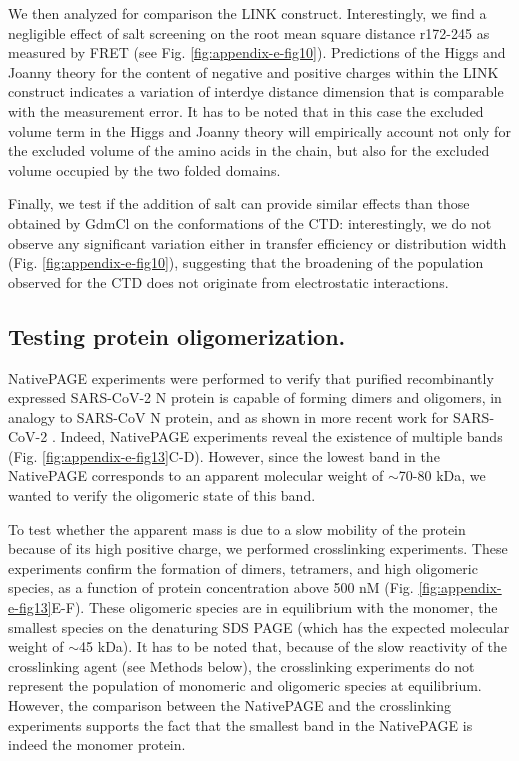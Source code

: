 \documentclass[../main.tex]{subfiles}
\begin{document}
        We then analyzed for comparison the LINK construct. Interestingly, we find a negligible effect of salt screening on the root mean square distance r172-245 as measured by FRET (see Fig. \ref{fig:appendix-e-fig10}). Predictions of the Higgs and Joanny theory for the content of negative and positive charges within the LINK construct indicates a variation of interdye distance dimension that is comparable with the measurement error. It has to be noted that in this case the excluded volume term in the Higgs and Joanny theory will empirically account not only for the excluded volume of the amino acids in the chain, but also for the excluded volume occupied by the two folded domains. 

        Finally, we test if the addition of salt can provide similar effects than those obtained by GdmCl on the conformations of the CTD: interestingly, we do not observe any significant variation either in transfer efficiency or distribution width (Fig. \ref{fig:appendix-e-fig10}), suggesting that the broadening of the population observed for the CTD does not originate from electrostatic interactions. 

    \subsection{Testing protein oligomerization.}
        NativePAGE experiments were performed to verify that purified recombinantly expressed SARS-CoV-2 N protein is capable of forming dimers and oligomers, in analogy to SARS-CoV N protein, and as shown in more recent work for SARS-CoV-2 \cite{Chang2009-vd,Takeda2008-wl,Zeng2020-cw}. Indeed, NativePAGE experiments reveal the existence of multiple bands (Fig. \ref{fig:appendix-e-fig13}C-D). However, since the lowest band in the NativePAGE corresponds to an apparent molecular weight of $\sim$70-80 kDa, we wanted to verify the oligomeric state of this band. 

        To test whether the apparent mass is due to a slow mobility of the protein because of its high positive charge, we performed crosslinking experiments. These experiments confirm the formation of dimers, tetramers, and high oligomeric species, as a function of protein concentration above 500 nM (Fig. \ref{fig:appendix-e-fig13}E-F). These oligomeric species are in equilibrium with the monomer, the smallest species on the denaturing SDS PAGE (which has the expected molecular weight of $\sim$45 kDa). It has to be noted that, because of the slow reactivity of the crosslinking agent (see Methods below), the crosslinking experiments do not represent the population of monomeric and oligomeric species at equilibrium. However, the comparison between the NativePAGE and the crosslinking experiments supports the fact that the smallest band in the NativePAGE is indeed the monomer protein. 
\end{document}
